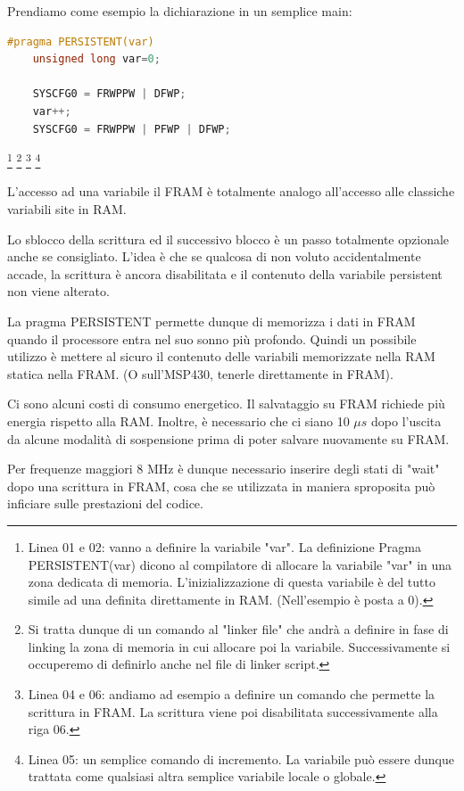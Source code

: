 \documentclass[LaM,binding=0.6cm]{../sapthesis}
\begin{document}
Prendiamo come esempio la dichiarazione in un semplice main:
\begin{lstlisting}[language=C]
    #pragma PERSISTENT(var)  
    unsigned long var=0;  
      
    SYSCFG0 = FRWPPW | DFWP;           
    var++;                             
    SYSCFG0 = FRWPPW | PFWP | DFWP; 

\end{lstlisting}

\footnote{
Linea 01 e 02: vanno a definire la variabile "var". La definizione Pragma PERSISTENT(var) dicono al compilatore di allocare la variabile "var" in una zona dedicata di memoria. L'inizializzazione di questa variabile è del tutto simile ad una definita direttamente in RAM. (Nell'esempio è posta a 0).
}
\footnote{
Si tratta dunque di un comando al "linker file" che andrà a definire in fase di linking la zona di memoria in cui allocare poi la variabile. Successivamente si occuperemo di definirlo anche nel file di linker script.}
\footnote{
Linea 04 e 06: andiamo ad esempio a definire un comando che permette la scrittura in FRAM. La scrittura viene poi disabilitata successivamente alla riga 06.
}
\footnote{
Linea 05: un semplice comando di incremento. La variabile può essere dunque trattata come qualsiasi altra semplice variabile locale o globale.
}

\clearpage
L'accesso ad una variabile il FRAM è totalmente analogo all'accesso alle classiche variabili site in RAM.

Lo sblocco della scrittura ed il successivo blocco è un passo totalmente opzionale anche se consigliato. L'idea è che se qualcosa di non voluto accidentalmente accade, la scrittura è ancora disabilitata e il contenuto della variabile persistent non viene alterato.

La pragma PERSISTENT permette dunque di memorizza i dati in FRAM quando il processore entra nel suo sonno più profondo.
Quindi un possibile utilizzo è mettere al sicuro il contenuto delle variabili memorizzate nella RAM statica nella FRAM. (O sull'MSP430, tenerle direttamente in FRAM).

Ci sono alcuni costi di consumo energetico. Il salvataggio su FRAM richiede più energia rispetto alla RAM. Inoltre, è necessario che ci siano 10 $\mu s$ dopo l'uscita da alcune modalità di sospensione prima di poter salvare nuovamente su FRAM.

Per frequenze maggiori 8 MHz è dunque necessario inserire degli stati di "wait" dopo una scrittura in FRAM, cosa che se utilizzata in maniera sproposita può inficiare sulle prestazioni del codice.
\end{document}
